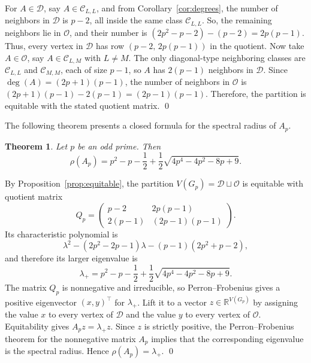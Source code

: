 \documentclass[12pt]{article}
\renewenvironment{proof}{{\bf \noindent Proof.}}{\qed}
\newtheorem{theorem}{Theorem}[section]
\theoremstyle{definition}
\newcommand{\calD}{\mathcal{D}}
\newcommand{\calO}{\mathcal{O}}
\newcommand{\calC}{\mathcal{C}}
\begin{document}
	\begin{proof}
		For $A\in \calD$, say $A\in\calC_{L,L}$, and from Corollary~\ref{cor:degrees}, the number of neighbors in $\calD$ is $p-2$, all inside the same class $\calC_{L,L}$. So, the remaining neighbors lie in $\calO$, and their number is $(2p^2-p-2)-(p-2)=2p(p-1).$ Thus, every vertex in $\calD$ has row $(p-2,\,2p(p-1))$ in the quotient. Now take $A\in \calO$, say $A\in\calC_{L,M}$ with $L\neq M$. The only diagonal-type neighboring classes are $\calC_{L,L}$ and $\calC_{M,M}$, each of size $p-1$, so $A$ has $2(p-1)$ neighbors in $\calD$. Since $\deg(A)=(2p+1)(p-1)$, the number of neighbors in $\calO$ is $(2p+1)(p-1)-2(p-1)=(2p-1)(p-1).$ 	Therefore, the partition is equitable with the stated quotient matrix.
	\end{proof}
	
	\medskip
	The following theorem presents a closed formula for the spectral radius of $A_p$. 	
	\begin{theorem}\label{thm:specradius}
		Let $p$ be an odd prime. Then
		$$
		\rho(A_p)
		=
		p^2-p-\frac12+\frac12\sqrt{4p^4-4p^2-8p+9}.
		$$
	\end{theorem}
	
	\begin{proof}
		By Proposition~\ref{prop:equitable}, the partition $V(G_p)=\calD\sqcup\calO$ is equitable with quotient matrix
		$$
		Q_p=
		\begin{pmatrix}
			p-2 & 2p(p-1)\\[1mm]
			2(p-1) & (2p-1)(p-1)
		\end{pmatrix}.
		$$
		Its characteristic polynomial is
		$$
		\lambda^2-(2p^2-2p-1)\lambda-(p-1)(2p^2+p-2),
		$$
		and therefore its larger eigenvalue is
		$$
		\lambda_+=p^2-p-\frac12+\frac12\sqrt{4p^4-4p^2-8p+9}.
		$$
		The matrix $Q_p$ is nonnegative and irreducible, so Perron--Frobenius gives a positive eigenvector $(x,y)^{\top}$ for $\lambda_+$. Lift it to a vector $z\in\mathbb R^{V(G_p)}$ by assigning the value $x$ to every vertex of $\calD$ and the value $y$ to every vertex of $\calO$. Equitability gives $A_pz=\lambda_+z$. Since $z$ is strictly positive, the Perron--Frobenius theorem for the nonnegative matrix $A_p$ implies that the corresponding eigenvalue is the spectral radius. Hence $\rho(A_p)=\lambda_+$.
	\end{proof}
	
\end{document}
